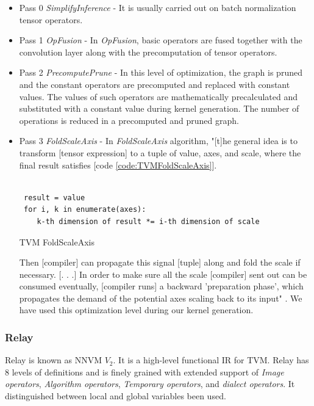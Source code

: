  \begin{itemize}
     \item Pass 0 \textit{SimplifyInference} -
It is usually carried out on batch normalization tensor operators.
 \item Pass 1 \textit{OpFusion} -
In \textit{OpFusion}, basic operators are fused together with the convolution layer along with the precomputation of tensor operators.
\item Pass  2 \textit{PrecomputePrune} -
In this level of optimization, the graph is pruned and the constant operators are precomputed and replaced with constant values. The values of such operators are mathematically precalculated and substituted with a constant value during kernel generation. The number of operations is reduced in a precomputed and pruned graph.
\item Pass  3 \textit{FoldScaleAxis} -
In \textit{FoldScaleAxis} algorithm, "[t]he general idea is to transform [tensor expression] to a tuple of value, axes, and scale, where the
final result satisfies [code \ref{code:TVMFoldScaleAxis}].
\begin{code}[!htb]
 \begin{verbatim}

 result = value
 for i, k in enumerate(axes):
    k-th dimension of result *= i-th dimension of scale
 \end{verbatim}
 \caption{TVM FoldScaleAxis \cite{FoldScaleAxis}}
\label{code:TVMFoldScaleAxis}
\end{code}
Then [compiler] can propagate this signal [tuple] along and fold the scale if necessary. [. . .] In order to make sure all the scale [compiler] sent out can be consumed eventually, [compiler runs] a backward 'preparation phase', which propagates the demand of the potential axes scaling back to its input" \cite{FoldScaleAxis}.
We have used this optimization level during our kernel generation.
 \end{itemize}
 
  \subsubsection{Relay}
Relay is known as NNVM {$V_2$}. It is a high-level functional IR for TVM.  Relay has 8 levels of definitions and is finely grained with extended support of \textit{Image operators}, \textit{Algorithm operators}, \textit{Temporary operators}, and \textit{dialect operators}. It distinguished between local and global variables been used.

